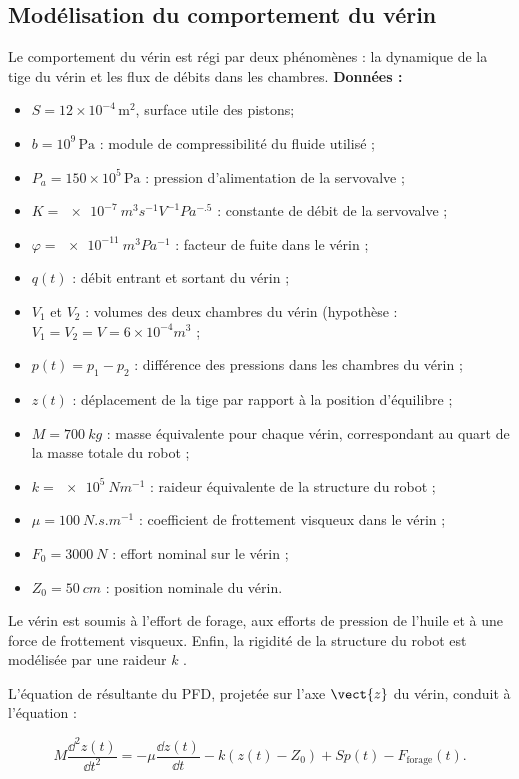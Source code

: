 \subsection*{Modélisation du comportement du vérin}

Le comportement du vérin est régi par deux phénomènes : la dynamique de la tige du vérin et
les flux de débits dans les chambres.
\textbf{Données : }
\begin{itemize}
\item $S=12\times 10^{-4}\,\text{m}^2$, surface utile des pistons;
\item $ b = {10^9}\,\text{Pa}$ : module de compressibilité du fluide utilisé ;
\item $P_a = 150 \times 10^5\,\text{Pa}$ : pression d’alimentation de la servovalve ;
\item $K = \SI{e-7}{m^3s^{-1}V^{-1}Pa^{-.5}}$ : constante de débit de la servovalve ;
\item $\varphi = \SI{e-11}{m^3 Pa^{-1}}$ : facteur de fuite dans le vérin ;
\item $q(t )$ : débit entrant et sortant du vérin ;
\item $V_1$ et $V_2$ : volumes des deux chambres du vérin (hypothèse : $V_1 = V_2 = V = 6\times 10^{-4} \si{m^3}$ ;
\item $p(t ) = p_1 -p_2$ : différence des pressions dans les chambres du vérin ;
\item $z (t )$ : déplacement de la tige par rapport à la position d’équilibre ;
\item $M = \SI{700}{kg}$ : masse équivalente pour chaque vérin, correspondant au quart de la masse
totale du robot ;
\item $k = \SI{e5}{Nm^{-1}}$ : raideur équivalente de la structure du robot ;
\item $\mu = \SI{100}{N.s.m^{-1}}$ : coefficient de frottement visqueux dans le vérin ;
\item $F_0 = \SI{3000}{N}$ : effort nominal sur le vérin ;
\item $Z_0 = \SI{50}{cm}$ : position nominale du vérin.
\end{itemize}
Le vérin est soumis à l’effort de forage, aux efforts de pression de l’huile et à une force de
frottement visqueux. Enfin, la rigidité de la structure du robot est modélisée par une raideur $k$ .

L’équation de résultante du PFD, projetée sur l’axe $\vect{z}$ du vérin, conduit à l’équation :

$$
M\dfrac{\dd^2 z(t)}{\dd t^2} = -\mu \dfrac{\dd z (t)}{\dd t} - k\left( z(t) - Z_0\right) +Sp(t)-F_{\text{forage}}(t).
$$

